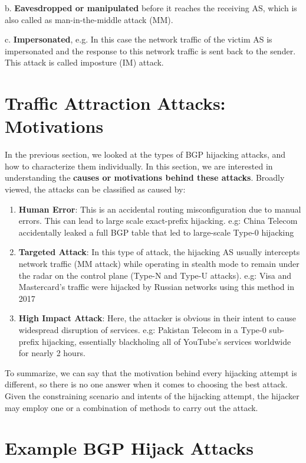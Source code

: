 \documentclass[11pt]{article}
\begin{document}
b. \textbf{Eavesdropped or manipulated} before it reaches the receiving AS, which is also called as man-in-the-middle attack (MM).

c. \textbf{Impersonated}, e.g. In this case the network traffic of the victim AS is impersonated and the response to this network traffic is sent back to the sender. This attack is called imposture (IM) attack.

\section{Traffic Attraction Attacks: Motivations}
\label{sec:org8eaf1e2}

In the previous section, we looked at the types of BGP hijacking attacks, and how to characterize them individually. In this section, we are interested in understanding the \textbf{causes or motivations behind these attacks}. Broadly viewed, the attacks can be classified as caused by:

\begin{enumerate}
\item \textbf{Human Error}: This is an accidental routing misconfiguration due to manual errors. This can lead to large scale exact-prefix hijacking. e.g: China Telecom accidentally leaked a full BGP table that led to large-scale Type-0 hijacking
\item \textbf{Targeted Attack}: In this type of attack, the hijacking AS usually intercepts network traffic (MM attack) while operating in stealth mode to remain under the radar on the control plane (Type-N and Type-U attacks). e.g: Visa and Mastercard’s traffic were hijacked by Russian networks using this method in 2017
\item \textbf{High Impact Attack}: Here, the attacker is obvious in their intent to cause widespread disruption of services. e.g: Pakistan Telecom in a Type-0 sub-prefix hijacking, essentially blackholing all of YouTube’s services worldwide for nearly 2 hours.
\end{enumerate}

To summarize, we can say that the motivation behind every hijacking attempt is different, so there is no one answer when it comes to choosing the best attack. Given the constraining scenario and intents of the hijacking attempt, the hijacker may employ one or a combination of methods to carry out the attack.

\section{Example BGP Hijack Attacks}
\label{sec:org247c69b}
\end{document}
